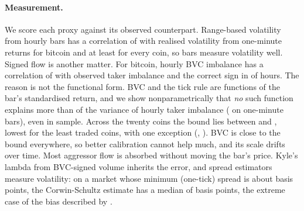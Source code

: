 \documentclass[11pt]{article}
\begin{document}
\paragraph{Measurement.} We score each proxy against its observed counterpart. Range-based
volatility from hourly bars has a correlation of \BTCgkCorr{} with realised volatility from
one-minute returns for bitcoin and at least \panelGkMin{} for every coin, so bars measure volatility
well. Signed flow is another matter. For bitcoin, hourly BVC imbalance has a correlation of
\BTCbvcCorr{} with observed taker imbalance and the correct sign in \BTCbvcSign{} of hours. The
reason is not the functional form. BVC and the tick rule are functions of the bar's standardised
return, and we show nonparametrically that \emph{no} such function explains more than \BTCceilIS{} of
the variance of hourly taker imbalance (\BTCceilISm{} on one-minute bars), even in sample. Across the
twenty coins the bound lies between \panelCeilMin{} and \panelCeilSecond, lowest for the least traded
coins, with one exception (\panelCeilMaxCoin, \panelCeilMax). BVC is close to the bound everywhere, so
better calibration cannot help much, and its scale drifts over time. Most aggressor flow is absorbed without moving the bar's price. Kyle's lambda
from BVC-signed volume inherits the error, and spread estimators measure volatility: on a market
whose minimum (one-tick) spread is about \BTCtick{} basis points, the Corwin-Schultz estimate has a
median of \BTCcsMedian{} basis points, the extreme case of the bias described by
\citet{jahanparvar2023}.
\end{document}
